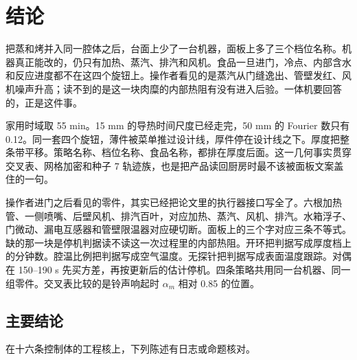 \chapter{结论}
\label{ch:conc}

把蒸和烤并入同一腔体之后，台面上少了一台机器，面板上多了三个档位名称。机器真正能改的，仍只有加热、蒸汽、排汽和风机。食品一旦进门，冷点、内部含水和反应进度都不在这四个旋钮上。操作者看见的是蒸汽从门缝逸出、管壁发红、风机噪声升高；读不到的是这一块肉糜的内部热阻有没有进入后验。一体机要回答的，正是这件事。

家用时域取 55 min。15 mm 的导热时间尺度已经走完，50 mm 的 Fourier 数只有 0.12。同一套四个旋钮，薄件被菜单推过设计线，厚件停在设计线之下。厚度把整条带平移。策略名称、档位名称、食品名称，都排在厚度后面。这一几何事实贯穿交叉表、网格加密和种子 7 轨迹族，也是把产品读回厨房时最不该被面板文案盖住的一句。

操作者进门之后看见的零件，其实已经把论文里的执行器接口写全了。六根加热管、一侧喷嘴、后壁风机、排汽百叶，对应加热、蒸汽、风机、排汽。水箱浮子、门微动、漏电互感器和管壁限温器对应硬切断。面板上的三个字对应三条不等式。缺的那一块是停机判据读不读这一次过程里的内部热阻。开环把判据写成厚度档上的分钟数。腔温比例把判据写成空气温度。无探针把判据写成表面温度跟踪。对偶在 150--190 s 先买方差，再按更新后的估计停机。四条策略共用同一台机器、同一组零件。交叉表比较的是铃声响起时 \(\alpha_m\) 相对 0.85 的位置。

\section{主要结论}

在十六条控制体的工程核上，下列陈述有日志或命题核对。


